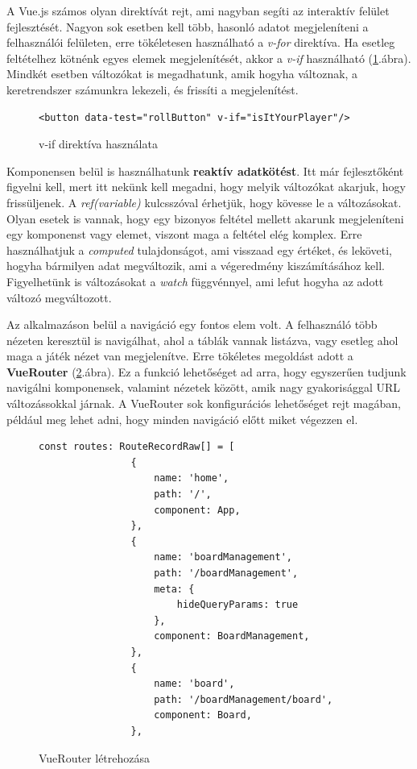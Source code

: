 \documentclass[a4paper,twoside]{article}
\begin{document}
A Vue.js számos olyan direktívát rejt, ami nagyban segíti az interaktív felület fejlesztését. Nagyon sok esetben kell több, hasonló adatot megjeleníteni a felhasználói felületen, erre tökéletesen használható a \textit{v-for} direktíva. Ha esetleg feltételhez kötnénk egyes elemek megjelenítését, akkor a \textit{v-if} használható (\ref{v-if}.ábra). Mindkét esetben változókat is megadhatunk, amik hogyha változnak, a keretrendszer számunkra lekezeli, és frissíti a megjelenítést.  

\begin{figure}
	\caption{v-if direktíva használata}
	
	\begin{minipage}{\textwidth}
		\begin{lstlisting}[style=javascriptStyle]
			<button data-test="rollButton" v-if="isItYourPlayer"/>
		\end{lstlisting}
	\end{minipage}
	
	\label{v-if}
\end{figure}

Komponensen belül is használhatunk \textbf{reaktív adatkötést}. Itt már fejlesztőként figyelni kell, mert itt nekünk kell megadni, hogy melyik változókat akarjuk, hogy frissüljenek. A \textit{ref(variable)} kulcsszóval érhetjük, hogy kövesse le a változásokat. Olyan esetek is vannak, hogy egy bizonyos feltétel mellett akarunk megjeleníteni egy komponenst vagy elemet, viszont maga a feltétel elég komplex. Erre használhatjuk a \textit{computed} tulajdonságot, ami visszaad egy értéket, és leköveti, hogyha bármilyen adat megváltozik, ami a végeredmény kiszámításához kell. Figyelhetünk is változásokat a \textit{watch} függvénnyel, ami lefut hogyha az adott változó megváltozott. 

Az alkalmazáson belül a navigáció egy fontos elem volt. A felhasználó több nézeten keresztül is navigálhat, ahol a táblák vannak listázva, vagy esetleg ahol maga a játék nézet van megjelenítve. Erre tökéletes megoldást adott a \textbf{VueRouter} (\ref{vuerouter}.ábra). Ez a funkció lehetőséget ad arra, hogy egyszerűen tudjunk navigálni komponensek, valamint nézetek között, amik nagy gyakorisággal URL változássokkal járnak. A VueRouter sok konfigurációs lehetőséget rejt magában, például meg lehet adni, hogy minden navigáció előtt miket végezzen el. 
\begin{figure}
	\caption{VueRouter létrehozása}
	
		\begin{minipage}{\textwidth}
			\begin{lstlisting}[style=javascriptStyle]
				const routes: RouteRecordRaw[] = [
				{
					name: 'home',
					path: '/',
					component: App,
				},
				{
					name: 'boardManagement',
					path: '/boardManagement',
					meta: {
						hideQueryParams: true
					},
					component: BoardManagement,
				},
				{
					name: 'board',
					path: '/boardManagement/board',
					component: Board,
				},
			\end{lstlisting}
		\end{minipage}
	
	\label{vuerouter}
\end{figure}
\end{document}
